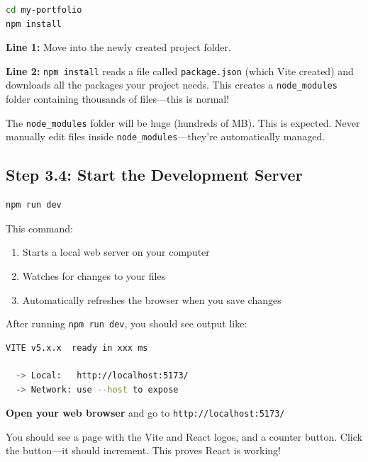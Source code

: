 \documentclass[12pt,a4paper]{article}
\begin{document}
\begin{lstlisting}[language=bash,caption={Navigate into project and install}]
cd my-portfolio
npm install
\end{lstlisting}

\begin{explanation}
\textbf{Line 1:} Move into the newly created project folder.

\textbf{Line 2:} \texttt{npm install} reads a file called \texttt{package.json} (which Vite created) and downloads all the packages your project needs. This creates a \texttt{node\_modules} folder containing thousands of files---this is normal!
\end{explanation}

\begin{warning}
The \texttt{node\_modules} folder will be huge (hundreds of MB). This is expected. Never manually edit files inside \texttt{node\_modules}---they're automatically managed.
\end{warning}

\subsection{Step 3.4: Start the Development Server}

\begin{lstlisting}[language=bash,caption={Start the local development server}]
npm run dev
\end{lstlisting}

\begin{explanation}
This command:
\begin{enumerate}
    \item Starts a local web server on your computer
    \item Watches for changes to your files
    \item Automatically refreshes the browser when you save changes
\end{enumerate}
\end{explanation}

\begin{checkpoint}
After running \texttt{npm run dev}, you should see output like:
\begin{lstlisting}[language=bash]
  VITE v5.x.x  ready in xxx ms

  -> Local:   http://localhost:5173/
  -> Network: use --host to expose
\end{lstlisting}

\textbf{Open your web browser} and go to \texttt{http://localhost:5173/}

You should see a page with the Vite and React logos, and a counter button. Click the button---it should increment. This proves React is working!
\end{checkpoint}
\end{document}
